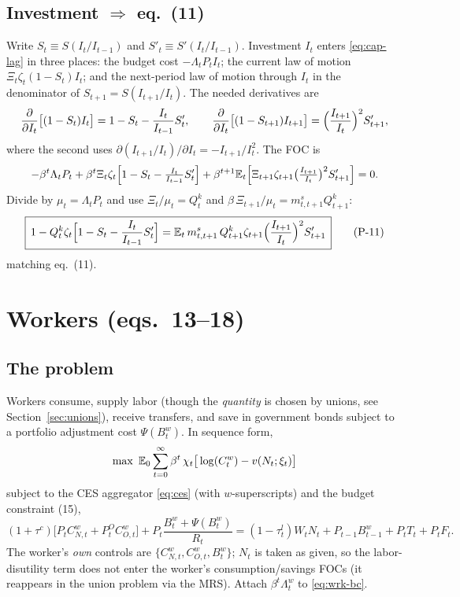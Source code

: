 \subsection{Investment \texorpdfstring{$\Rightarrow$}{=>} eq.\ (11)}
Write $S_t\equiv S(I_t/I_{t-1})$ and $S'_t\equiv S'(I_t/I_{t-1})$. Investment $I_t$ enters
\eqref{eq:cap-lag} in three places: the budget cost $-\Lambda_tP_tI_t$; the current law of motion
$\Xi_t\zeta_t(1-S_t)I_t$; and the next-period law of motion through $I_t$ in the denominator of
$S_{t+1}=S(I_{t+1}/I_t)$. The needed derivatives are
\[
\frac{\partial }{\partial I_t}\big[(1-S_t)I_t\big]=1-S_t-\frac{I_t}{I_{t-1}}S'_t,\qquad
\frac{\partial }{\partial I_t}\big[(1-S_{t+1})I_{t+1}\big]=\Big(\frac{I_{t+1}}{I_t}\Big)^2 S'_{t+1},
\]
where the second uses $\partial(I_{t+1}/I_t)/\partial I_t=-I_{t+1}/I_t^2$. The FOC is
\[
-\beta^t\Lambda_tP_t+\beta^t\Xi_t\zeta_t\Big[1-S_t-\tfrac{I_t}{I_{t-1}}S'_t\Big]
+\beta^{t+1}\mathbb{E}_t\Big[\Xi_{t+1}\zeta_{t+1}\big(\tfrac{I_{t+1}}{I_t}\big)^2 S'_{t+1}\Big]=0.
\]
Divide by $\mu_t=\Lambda_tP_t$ and use $\Xi_t/\mu_t=Q^k_t$ and $\beta\,\Xi_{t+1}/\mu_t=m^s_{t,t+1}Q^k_{t+1}$:
\begin{equation}\label{eq:11}
\boxed{\,1-Q^k_t\zeta_t\Big[1-S_t-\frac{I_t}{I_{t-1}}S'_t\Big]
=\mathbb{E}_t\,m^s_{t,t+1}\,Q^k_{t+1}\zeta_{t+1}\Big(\frac{I_{t+1}}{I_t}\Big)^2 S'_{t+1}\,}
\tag{P-11}
\end{equation}
matching eq.\ (11).

\section{Workers (eqs.\ 13--18)}

\subsection{The problem}
Workers consume, supply labor (though the \emph{quantity} is chosen by unions, see
Section~\ref{sec:unions}), receive transfers, and save in government bonds subject to a portfolio
adjustment cost $\Psi(B^w_t)$. In sequence form,
\begin{equation}\label{eq:wrk-obj}
\max\ \E_0\sum_{t=0}^\infty\beta^t\,\chi_t\big[\log(C^w_t)-v(N_t;\xi_t)\big]
\end{equation}
subject to the CES aggregator \eqref{eq:ces} (with $w$-superscripts) and the budget constraint (15),
\begin{equation}\label{eq:wrk-bc}
(1+\tau^c)\big[P_tC^w_{N,t}+P^O_tC^w_{O,t}\big]+P_t\frac{B^w_t+\Psi(B^w_t)}{R_t}
=(1-\tau^l_t)W_tN_t+P_{t-1}B^w_{t-1}+P_tT_t+P_tF_t .
\tag{P-15}
\end{equation}
The worker's \emph{own} controls are $\{C^w_{N,t},C^w_{O,t},B^w_t\}$; $N_t$ is taken as given, so the
labor-disutility term does not enter the worker's consumption/savings FOCs (it reappears in the union
problem via the MRS). Attach $\beta^t\Lambda^w_t$ to \eqref{eq:wrk-bc}.

